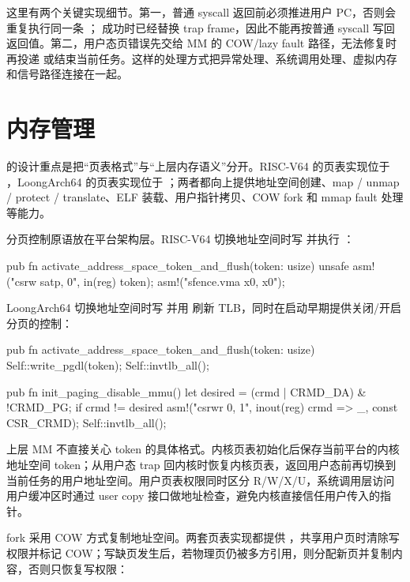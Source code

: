 这里有两个关键实现细节。第一，普通 syscall 返回前必须推进用户 PC，否则会重复执行同一条 ； 成功时已经替换 trap frame，因此不能再按普通 syscall 写回返回值。第二，用户态页错误先交给 MM 的 COW/lazy fault 路径，无法修复时再投递  或结束当前任务。这样的处理方式把异常处理、系统调用处理、虚拟内存和信号路径连接在一起。


\section{内存管理}

 的设计重点是把“页表格式”与“上层内存语义”分开。RISC-V64 的页表实现位于 ，LoongArch64 的页表实现位于 ；两者都向上提供地址空间创建、map / unmap / protect / translate、ELF 装载、用户指针拷贝、COW fork 和 mmap fault 处理等能力。

分页控制原语放在平台架构层。RISC-V64 切换地址空间时写  并执行 ：

\begin{rustcode}
pub fn activate_address_space_token_and_flush(token: usize) {
    unsafe {
        asm!("csrw satp, {0}", in(reg) token);
        asm!("sfence.vma x0, x0");
    }
}
\end{rustcode}

LoongArch64 切换地址空间时写  并用  刷新 TLB，同时在启动早期提供关闭/开启分页的控制：

\begin{rustcode}
pub fn activate_address_space_token_and_flush(token: usize) {
    Self::write_pgdl(token);
    Self::invtlb_all();
}

pub fn init_paging_disable_mmu() {
    let desired = (crmd | CRMD_DA) & !CRMD_PG;
    if crmd != desired {
        asm!("csrwr {0}, {1}", inout(reg) crmd => _, const CSR_CRMD);
        Self::invtlb_all();
    }
}
\end{rustcode}

上层 MM 不直接关心 token 的具体格式。内核页表初始化后保存当前平台的内核地址空间 token；从用户态 trap 回内核时恢复内核页表，返回用户态前再切换到当前任务的用户地址空间。用户页表权限同时区分 R/W/X/U，系统调用层访问用户缓冲区时通过 user copy 接口做地址检查，避免内核直接信任用户传入的指针。

fork 采用 COW 方式复制地址空间。两套页表实现都提供 ，共享用户页时清除写权限并标记 COW；写缺页发生后，若物理页仍被多方引用，则分配新页并复制内容，否则只恢复写权限：

